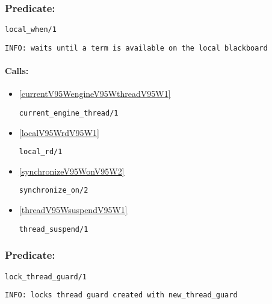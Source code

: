 \subsubsection{Predicate:} \label{localV95WwhenV95W1}

\begin{verbatim}
local_when/1
\end{verbatim}

{\small \begin{verbatim}
INFO: waits until a term is available on the local blackboard

\end{verbatim}}
\paragraph{Calls:} 
\begin{itemize}
\item \ref{currentV95WengineV95WthreadV95W1} 
\begin{verbatim}
current_engine_thread/1
\end{verbatim}

\item \ref{localV95WrdV95W1} 
\begin{verbatim}
local_rd/1
\end{verbatim}

\item \ref{synchronizeV95WonV95W2} 
\begin{verbatim}
synchronize_on/2
\end{verbatim}

\item \ref{threadV95WsuspendV95W1} 
\begin{verbatim}
thread_suspend/1
\end{verbatim}

\end{itemize}

\subsubsection{Predicate:} \label{lockV95WthreadV95WguardV95W1}

\begin{verbatim}
lock_thread_guard/1
\end{verbatim}

{\small \begin{verbatim}
INFO: locks thread guard created with new_thread_guard

\end{verbatim}}
